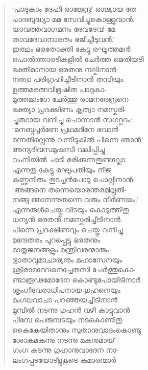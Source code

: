 \begin{verse}
‘പാദുകാം ദേഹി രാജേന്ദ്ര! രാജ്യായ തേ\\
പാദബുദ്ധ്യാ മമ സേവിച്ചുകൊള്ളുവാന്‍.\\
യാവത്തവാഗമനം ദേവദേവ! മേ\\
താവദേവാനാരതം ഭജിച്ചീടുവന്‍.’\\
ഇത്ഥം ഭരതോക്തി കേട്ടു രഘൂത്തമന്‍\\
പൊല്‍ത്താരടികളില്‍ ചേര്‍ത്ത മെതിയടി\\
ഭക്തിമാനായ ഭരതനു നല്കിനാന്‍;\\
നത്വാ പരിഗ്രഹിച്ചീടിനാന്‍ തമ്പിയും.\\
ഉത്തമരത്നവിഭൂഷിത പാദുകാ-\\
മുത്തമാംഗേ ചേര്‍ത്തു രാമനരേന്ദ്രനെ\\
ഭക്ത്യാ പ്രദക്ഷിണം കൃത്വാ നമസ്കരി-\\
ച്ചുത്ഥായ വന്ദിച്ചു ചൊന്നാന്‍ സഗദ്ഗദം:\\
‘മനബ്ദപൂര്‍ണേ പ്രഥമദിനേ ഭവാന്‍\\
മന്നതില്ലെന്നു വന്നീടുകില്‍ പിന്നെ ഞാന്‍\\
അന്യദിവസമുഷസി വലിപ്പിച്ചു\\
വഹ്നിയില്‍ ചാടി മരിക്കുന്നതുണ്ടല്ലോ.\\
എന്നതു കേട്ടു രഘുപതിയും നിജ\\
കണ്ണുനീരും തുടച്ചന്‍പോടു ചൊല്ലിനാന്‍:\\
‘അങ്ങനെ തന്നെയൊരന്തരമില്ലതി-\\
നങ്ങു ഞാനന്നുതന്നെ വരും നിര്‍ണയം.’\\
എന്നരുള്‍ചെയ്തു വിടയും കൊടുത്തിതു\\
ധന്യന്‍ ഭരതന്‍ നമസ്കരിച്ചീടിനാന്‍.\\
പിന്നെ പ്രദക്ഷിണവും ചെയ്തു വന്ദിച്ചു\\
മന്ദേതരം പുറപ്പെട്ടു ഭരതനും\\
മാതൃജനങ്ങളും മന്ത്രിവരന്മാരും\\
ഭ്രാതാവുമാചാര്യനും മഹാസേനയും\\
ശ്രീരാമദേവനെച്ചേതസി ചേര്‍ത്തുകൊ-\\
ണ്ടാരൂഢമോദേന കൊണ്ടുപോയീടിനാര്‍.\\
ശൃംഗിവേരാധിപനായ ഗുഹനെയും\\
മംഗലവാചാ പറഞ്ഞയച്ചീടിനാന്‍.\\
മുമ്പില്‍ നടന്നു ഗുഹന്‍ വഴി കാട്ടുവാന്‍\\
പിമ്പേ പെരുമ്പടയും നടകൊണ്ടിതു.\\
കൈകേയിതാനും സുതാനുവാദംകൊണ്ടു\\
ശോകമകന്നു നടന്നു മകനുമായ്\\
ഗംഗ കടന്നു ഗുഹാനുവാദേന നാ-\\
ലംഗപ്പടയോട്ളുകൂടെ കുമാരന്മാര്‍\\

\end{verse}
